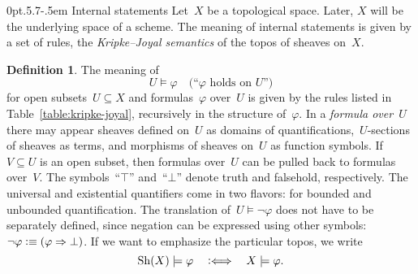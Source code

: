 \documentclass[10pt,reqno,a4paper]{amsbook}
\makeatletter
\theoremstyle{definition}
\newtheorem{defn}{Definition}[section]
\theoremstyle{plain}
\theoremstyle{remark}
\newcommand{\Sh}{\mathrm{Sh}}
\newcommand{\?}{\,{:}\,}
\renewcommand{\_}{\mathpunct{.}\,}
\newcommand{\Ll}{\vcentcolon\Longleftrightarrow}
\newcommand{\defequiv}{\vcentcolon\equiv}
\def\subsection{\@startsection{subsection}{2}%
  {0pt}{.5\linespacing\@plus.7\linespacing}{-.5em}%
  {\normalfont\bfseries}}
\makeatother
\begin{document}
\subsection{Internal statements}
Let~$X$ be a topological space. Later, $X$ will be the underlying space of a
scheme. The meaning of internal statements is given by a set of rules, the
\emph{Kripke--Joyal semantics} of the topos of sheaves on~$X$.

\begin{defn}\label{defn:kripke-joyal}The meaning of
\[ U \models \varphi \quad\text{(``$\varphi$ holds on $U$'')} \]
for open subsets~$U \subseteq X$ and formulas~$\varphi$ over~$U$ is given by
the rules listed in Table~\ref{table:kripke-joyal}, recursively in the structure of~$\varphi$.
In a \emph{formula over~$U$} there may appear sheaves defined on~$U$ as domains
of quantifications,~$U$-sections of sheaves as terms, and morphisms of sheaves
on~$U$ as function symbols. If~$V \subseteq U$ is an open subset, then formulas
over~$U$ can be pulled back to formulas over~$V$. The symbols~``$\top$'' and~``$\bot$'' denote truth
and falsehold, respectively. The universal and existential quantifiers come in
two flavors: for bounded and unbounded quantification.
The translation of~$U \models \neg\varphi$ does not have to be separately defined, since
negation can be expressed using other symbols: $\neg\varphi \defequiv (\varphi
\Rightarrow \bot)$. If we want to emphasize the particular topos, we write
\[ \Sh(X) \models \varphi \quad\Ll\quad X \models \varphi. \]
\end{defn}
\end{document}
